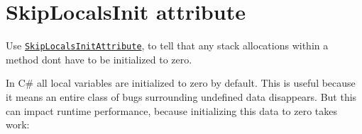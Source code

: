 \chapter{Skip\+Locals\+Init attribute}
\hypertarget{md__hey_tea_9_2_library_2_package_cache_2com_8unity_8burst_0d1_88_87_2_documentation_0i_2optimization-skiplocalsinit}{}\label{md__hey_tea_9_2_library_2_package_cache_2com_8unity_8burst_0d1_88_87_2_documentation_0i_2optimization-skiplocalsinit}
\label{md__hey_tea_9_2_library_2_package_cache_2com_8unity_8burst_0d1_88_87_2_documentation_0i_2optimization-skiplocalsinit_autotoc_md427}%
%
 Use \href{xref:Unity.Burst.CompilerServices.SkipLocalsInitAttribute}{\texttt{ {\ttfamily Skip\+Locals\+Init\+Attribute}}}, to tell  that any stack allocations within a method don\textquotesingle{}t have to be initialized to zero.

In C\# all local variables are initialized to zero by default. This is useful because it means an entire class of bugs surrounding undefined data disappears. But this can impact runtime performance, because initializing this data to zero takes work\+:


\begin{DoxyCode}{0}
\DoxyCodeLine{\textcolor{preprocessor}{\ \#}}
\DoxyCodeLine{}
\DoxyCodeLine{\{}
\DoxyCodeLine{}
\DoxyCodeLine{\ \ \ \ \textcolor{comment}{//\ Initialize\ every\ field\ of\ data\ to\ be\ an\ incrementing\ set\ of\ values.}}
\DoxyCodeLine{\ \ \ \ \{}
\DoxyCodeLine{\ \ \ \ \}}
\DoxyCodeLine{}
\DoxyCodeLine{\ \ \ \ \textcolor{comment}{//\ Use\ the\ data\ elsewhere.}}
\DoxyCodeLine{\}}

\end{DoxyCode}


